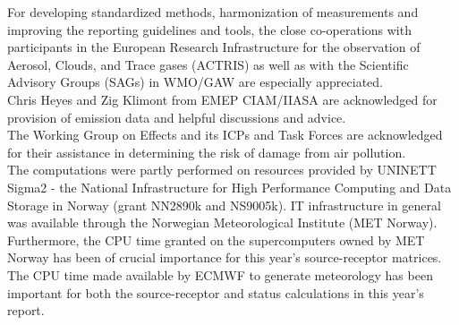 For developing standardized methods, harmonization of measurements and improving the reporting guidelines and tools, the close co-operations with participants in the European Research Infrastructure for the observation of Aerosol, Clouds, and Trace gases (ACTRIS) as well as with the Scientific Advisory Groups (SAGs) in WMO/GAW are especially appreciated. \\

\newpage
Chris Heyes and Zig Klimont from EMEP CIAM/IIASA are acknowledged for provision of emission data and helpful discussions and advice.\\


The Working Group on Effects and its ICPs and Task Forces are
acknowledged for their assistance in determining the risk of damage
from air pollution.\\

The computations were partly performed on resources provided by 
UNINETT Sigma2 - the National Infrastructure for High Performance Computing and 
Data Storage in Norway (grant NN2890k and NS9005k). IT infrastructure in general was available through the Norwegian Meteorological Institute (MET Norway). Furthermore, the CPU time granted on the supercomputers owned by MET Norway has been of crucial importance for this year's source-receptor matrices. The CPU time made available by ECMWF to generate meteorology has been important for both the source-receptor and status calculations in this year's report.\\


